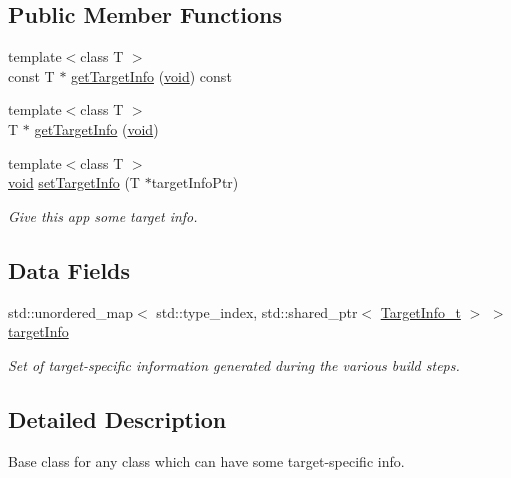 \subsection*{Public Member Functions}
\begin{DoxyCompactItemize}
\item 
{\footnotesize template$<$class T $>$ }\\const T $\ast$ \hyperlink{structmodel_1_1_has_target_info__t_affa44f1e0fd148e8dd1484be573c2ba0}{get\+Target\+Info} (\hyperlink{_t_e_m_p_l_a_t_e__cdef_8h_ac9c84fa68bbad002983e35ce3663c686}{void}) const 
\item 
{\footnotesize template$<$class T $>$ }\\T $\ast$ \hyperlink{structmodel_1_1_has_target_info__t_a3991f3d8a84ae241d878385ed7dd8763}{get\+Target\+Info} (\hyperlink{_t_e_m_p_l_a_t_e__cdef_8h_ac9c84fa68bbad002983e35ce3663c686}{void})
\item 
{\footnotesize template$<$class T $>$ }\\\hyperlink{_t_e_m_p_l_a_t_e__cdef_8h_ac9c84fa68bbad002983e35ce3663c686}{void} \hyperlink{structmodel_1_1_has_target_info__t_ae9113783b6edabe840dbcdcc56034d8b}{set\+Target\+Info} (T $\ast$target\+Info\+Ptr)
\begin{DoxyCompactList}\small\item\em Give this app some target info. \end{DoxyCompactList}\end{DoxyCompactItemize}
\subsection*{Data Fields}
\begin{DoxyCompactItemize}
\item 
std\+::unordered\+\_\+map$<$ std\+::type\+\_\+index, std\+::shared\+\_\+ptr$<$ \hyperlink{classmodel_1_1_target_info__t}{Target\+Info\+\_\+t} $>$ $>$ \hyperlink{structmodel_1_1_has_target_info__t_a02e0f86dcb7dc3a127b4137229e6e300}{target\+Info}
\begin{DoxyCompactList}\small\item\em Set of target-\/specific information generated during the various build steps. \end{DoxyCompactList}\end{DoxyCompactItemize}


\subsection{Detailed Description}
Base class for any class which can have some target-\/specific info. 

